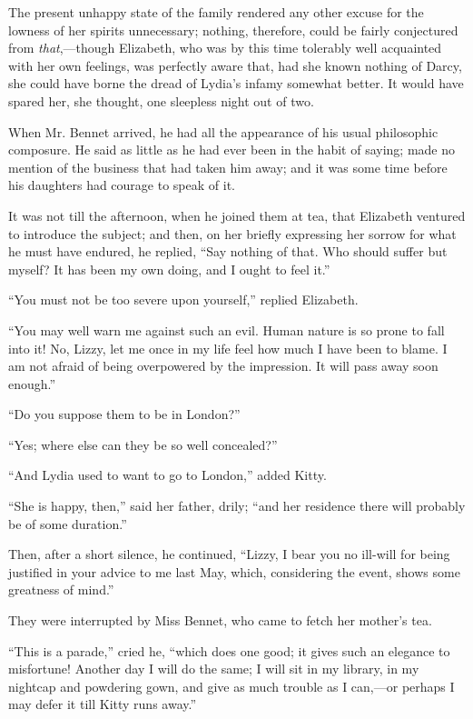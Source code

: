 The present unhappy state of the family rendered any other excuse for the lowness of her spirits unnecessary; nothing, therefore, could be fairly conjectured from \textit{that},---though Elizabeth, who was by this time tolerably well acquainted with her own feelings, was perfectly aware that, had she known nothing of Darcy, she could have borne the dread of Lydia's infamy somewhat better. It would have spared her, she thought, one sleepless night out of two.

When Mr. Bennet arrived, he had all the appearance of his usual philosophic composure. He said as little as he had ever been in the habit of saying; made no mention of the business that had taken him away; and it was some time before his daughters had courage to speak of it.

It was not till the afternoon, when he joined them at tea, that Elizabeth ventured to introduce the subject; and then, on her briefly expressing her sorrow for what he must have endured, he replied, ``Say nothing of that. Who should suffer but myself? It has been my own doing, and I ought to feel it.''

``You must not be too severe upon yourself,'' replied Elizabeth.

``You may well warn me against such an evil. Human nature is so prone to fall into it! No, Lizzy, let me once in my life feel how much I have been to blame. I am not afraid of being overpowered by the impression. It will pass away soon enough.''

``Do you suppose them to be in London?''

``Yes; where else can they be so well concealed?''

``And Lydia used to want to go to London,'' added Kitty.

``She is happy, then,'' said her father, drily; ``and her residence there will probably be of some duration.''

Then, after a short silence, he continued, ``Lizzy, I bear you no ill-will for being justified in your advice to me last May, which, considering the event, shows some greatness of mind.''

They were interrupted by Miss Bennet, who came to fetch her mother's tea.

``This is a parade,'' cried he, ``which does one good; it gives such an elegance to misfortune! Another day I will do the same; I will sit in my library, in my nightcap and powdering gown, and give as much trouble as I can,---or perhaps I may defer it till Kitty runs away.''

